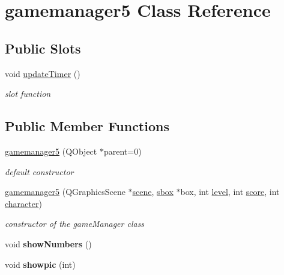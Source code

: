 \hypertarget{classgamemanager5}{\section{gamemanager5 \-Class \-Reference}
\label{classgamemanager5}
}
\subsection*{\-Public \-Slots}
\begin{DoxyCompactItemize}
\item 
void \hyperlink{classgamemanager5_a4783b846347e81378e5b8bdaf6ef9a58}{update\-Timer} ()
\begin{DoxyCompactList}\small\item\em slot function \end{DoxyCompactList}\end{DoxyCompactItemize}
\subsection*{\-Public \-Member \-Functions}
\begin{DoxyCompactItemize}
\item 
\hypertarget{classgamemanager5_a74b64f023b7acb02989a125b4dc12066}{\hyperlink{classgamemanager5_a74b64f023b7acb02989a125b4dc12066}{gamemanager5} (\-Q\-Object $\ast$parent=0)}\label{classgamemanager5_a74b64f023b7acb02989a125b4dc12066}

\begin{DoxyCompactList}\small\item\em default constructor \end{DoxyCompactList}\item 
\hyperlink{classgamemanager5_aa214413b1d38730512931384a82077d8}{gamemanager5} (\-Q\-Graphics\-Scene $\ast$\hyperlink{classgamemanager5_a532d4fe5a6475f499c5c084038171ec6}{scene}, \hyperlink{classsbox}{sbox} $\ast$box, int \hyperlink{classgamemanager5_a67c82306ab6f2f18bd8207437e668638}{level}, int \hyperlink{classgamemanager5_a3e6cfbb815b5db771e59cb69c79e39f1}{score}, int \hyperlink{classgamemanager5_acc4a21dc14658ad2cc9d8848fb88f375}{character})
\begin{DoxyCompactList}\small\item\em constructor of the game\-Manager class \end{DoxyCompactList}\item 
\hypertarget{classgamemanager5_ad0c0f6474bee29c68f9663c4a07540dc}{void {\bfseries show\-Numbers} ()}\label{classgamemanager5_ad0c0f6474bee29c68f9663c4a07540dc}

\item 
\hypertarget{classgamemanager5_adc4d23ea845ae27c35aef5f1f7ce2fba}{void {\bfseries showpic} (int)}\label{classgamemanager5_adc4d23ea845ae27c35aef5f1f7ce2fba}

\end{DoxyCompactItemize}
